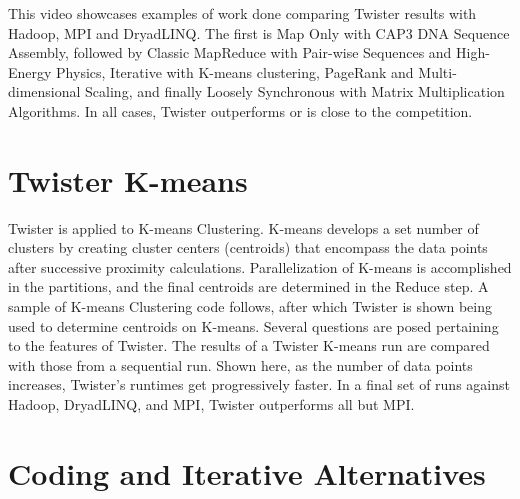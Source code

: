 This video showcases examples of work done comparing Twister results
with Hadoop, MPI and DryadLINQ. The first is Map Only with CAP3 DNA
Sequence Assembly, followed by Classic MapReduce with Pair-wise
Sequences and High-Energy Physics, Iterative with K-means clustering,
PageRank and Multi-dimensional Scaling, and finally Loosely Synchronous
with Matrix Multiplication Algorithms. In all cases, Twister outperforms
or is close to the competition.




\section{Twister K-means}

Twister is applied to K-means Clustering. K-means develops a set number
of clusters by creating cluster centers (centroids) that encompass the
data points after successive proximity calculations. Parallelization of
K-means is accomplished in the partitions, and the final centroids are
determined in the Reduce step. A sample of K-means Clustering code
follows, after which Twister is shown being used to determine centroids
on K-means. Several questions are posed pertaining to the features of
Twister. The results of a Twister K-means run are compared with those
from a sequential run. Shown here, as the number of data points
increases, Twister's runtimes get progressively faster. In a final set
of runs against Hadoop, DryadLINQ, and MPI, Twister outperforms all but
MPI.




\section{Coding and Iterative Alternatives}


